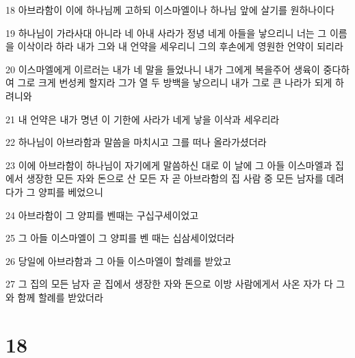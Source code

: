 \par 18 아브라함이 이에 하나님께 고하되 이스마엘이나 하나님 앞에 살기를 원하나이다
\par 19 하나님이 가라사대 아니라 네 아내 사라가 정녕 네게 아들을 낳으리니 너는 그 이름을 이삭이라 하라 내가 그와 내 언약을 세우리니 그의 후손에게 영원한 언약이 되리라
\par 20 이스마엘에게 이르러는 내가 네 말을 들었나니 내가 그에게 복을주어 생육이 중다하여 그로 크게 번성케 할지라 그가 열 두 방백을 낳으리니 내가 그로 큰 나라가 되게 하려니와
\par 21 내 언약은 내가 명년 이 기한에 사라가 네게 낳을 이삭과 세우리라
\par 22 하나님이 아브라함과 말씀을 마치시고 그를 떠나 올라가셨더라
\par 23 이에 아브라함이 하나님이 자기에게 말씀하신 대로 이 날에 그 아들 이스마엘과 집에서 생장한 모든 자와 돈으로 산 모든 자 곧 아브라함의 집 사람 중 모든 남자를 데려다가 그 양피를 베었으니
\par 24 아브라함이 그 양피를 벤때는 구십구세이었고
\par 25 그 아들 이스마엘이 그 양피를 벤 때는 십삼세이었더라
\par 26 당일에 아브라함과 그 아들 이스마엘이 할례를 받았고
\par 27 그 집의 모든 남자 곧 집에서 생장한 자와 돈으로 이방 사람에게서 사온 자가 다 그와 함께 할례를 받았더라

\chapter{18}

